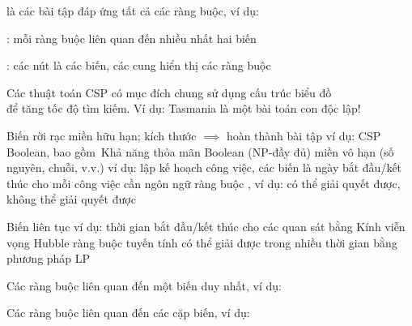 \documentclass{article}
\begin{document}
\begin{huge}
\vspace*{0.1in}

\textwidth
{}

 là các bài tập đáp ứng tất cả các ràng buộc, ví dụ:\\




: mỗi ràng buộc liên quan đến nhiều nhất hai biến

: các nút là các biến, các cung hiển thị các ràng buộc

\vspace*{-0.5in}

\textwidth
{}

Các thuật toán CSP có mục đích chung sử dụng cấu trúc biểu đồ\\
để tăng tốc độ tìm kiếm. Ví dụ: Tasmania là một bài toán con độc lập!


Biến rời rạc\al
  miền hữu hạn; kích thước  $\implies$  hoàn thành bài tập \nl
    \blob ví dụ: CSP Boolean, bao gồm~Khả năng thỏa mãn Boolean (NP-đầy đủ)\al
  miền vô hạn (số nguyên, chuỗi, v.v.)\nl
    \blob ví dụ: lập kế hoạch công việc, các biến là ngày bắt đầu/kết thúc cho mỗi công việc\nl
    \blob cần ngôn ngữ ràng buộc , ví dụ: \nl
    \blob {} có thể giải quyết được,  không thể giải quyết được

Biến liên tục\al
    \blob ví dụ: thời gian bắt đầu/kết thúc cho các quan sát bằng Kính viễn vọng Hubble\al
    \blob ràng buộc tuyến tính có thể giải được trong nhiều thời gian bằng phương pháp LP


Các ràng buộc  liên quan đến một biến duy nhất, \al
   ví dụ: 

Các ràng buộc  liên quan đến các cặp biến, \al
   ví dụ: 


\end{huge}
\end{document}

